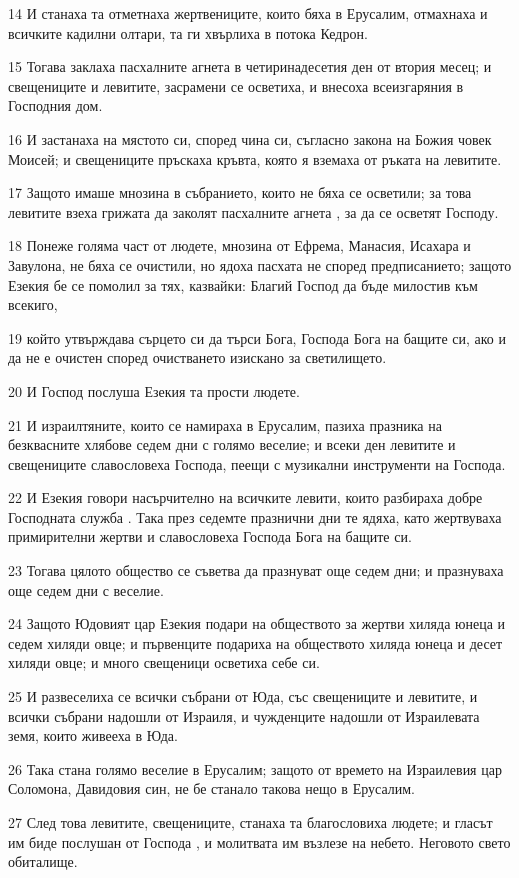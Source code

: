 \par 14 И станаха та отметнаха жертвениците, които бяха в Ерусалим, отмахнаха и всичките кадилни олтари, та ги хвърлиха в потока Кедрон.
\par 15 Тогава заклаха пасхалните агнета в четиринадесетия ден от втория месец; и свещениците и левитите, засрамени се осветиха, и внесоха всеизгаряния в Господния дом.
\par 16 И застанаха на мястото си, според чина си, съгласно закона на Божия човек Моисей; и свещениците пръскаха кръвта, която я вземаха от ръката на левитите.
\par 17 Защото имаше мнозина в събранието, които не бяха се осветили; за това левитите взеха грижата да заколят пасхалните агнета , за да се осветят Господу.
\par 18 Понеже голяма част от людете, мнозина от Ефрема, Манасия, Исахара и Завулона, не бяха се очистили, но ядоха пасхата не според предписанието; защото Езекия бе се помолил за тях, казвайки: Благий Господ да бъде милостив към всекиго,
\par 19 който утвърждава сърцето си да търси Бога, Господа Бога на бащите си, ако и да не е очистен според очистването изискано за светилището.
\par 20 И Господ послуша Езекия та прости людете.
\par 21 И израилтяните, които се намираха в Ерусалим, пазиха празника на безквасните хлябове седем дни с голямо веселие; и всеки ден левитите и свещениците славословеха Господа, пеещи с музикални инструменти на Господа.
\par 22 И Езекия говори насърчително на всичките левити, които разбираха добре Господната служба . Така през седемте празнични дни те ядяха, като жертвуваха примирителни жертви и славословеха Господа Бога на бащите си.
\par 23 Тогава цялото общество се съветва да празнуват още седем дни; и празнуваха още седем дни с веселие.
\par 24 Защото Юдовият цар Езекия подари на обществото за жертви хиляда юнеца и седем хиляди овце; и първенците подариха на обществото хиляда юнеца и десет хиляди овце; и много свещеници осветиха себе си.
\par 25 И развеселиха се всички събрани от Юда, със свещениците и левитите, и всички събрани надошли от Израиля, и чужденците надошли от Израилевата земя, които живееха в Юда.
\par 26 Така стана голямо веселие в Ерусалим; защото от времето на Израилевия цар Соломона, Давидовия син, не бе станало такова нещо в Ерусалим.
\par 27 След това левитите, свещениците, станаха та благословиха людете; и гласът им биде послушан от Господа , и молитвата им възлезе на небето. Неговото свето обиталище.

